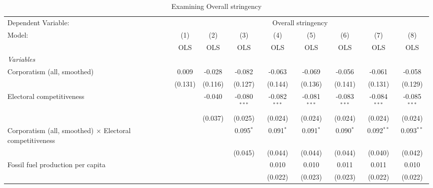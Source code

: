 
\begin{table}[htbp]
   \caption{Examining Overall stringency}
   \centering
   \begin{tabular}{lcccccccc}
      \toprule
      Dependent Variable: & \multicolumn{8}{c}{Overall stringency}\\
      Model:                                                          & (1)     & (2)     & (3)            & (4)            & (5)            & (6)            & (7)            & (8)\\  
                                                                      &  OLS    & OLS     & OLS            & OLS            & OLS            & OLS            & OLS            & OLS\\  
      \midrule
      \emph{Variables}\\
      Corporatism (all, smoothed)                                     & 0.009   & -0.028  & -0.082         & -0.063         & -0.069         & -0.056         & -0.061         & -0.058\\   
                                                                      & (0.131) & (0.116) & (0.127)        & (0.144)        & (0.136)        & (0.141)        & (0.131)        & (0.129)\\   
      Electoral competitiveness                                       &         & -0.040  & -0.080$^{***}$ & -0.082$^{***}$ & -0.081$^{***}$ & -0.083$^{***}$ & -0.084$^{***}$ & -0.085$^{***}$\\   
                                                                      &         & (0.037) & (0.025)        & (0.024)        & (0.024)        & (0.024)        & (0.024)        & (0.024)\\   
      Corporatism (all, smoothed) $\times$ Electoral competitiveness  &         &         & 0.095$^{*}$    & 0.091$^{*}$    & 0.091$^{*}$    & 0.090$^{*}$    & 0.092$^{**}$   & 0.093$^{**}$\\   
                                                                      &         &         & (0.045)        & (0.044)        & (0.044)        & (0.044)        & (0.040)        & (0.042)\\   
      Fossil fuel production per capita                               &         &         &                & 0.010          & 0.010          & 0.011          & 0.011          & 0.010\\   
                                                                      &         &         &                & (0.022)        & (0.023)        & (0.023)        & (0.022)        & (0.022)\\   

\end{tabular}
\end{table}
